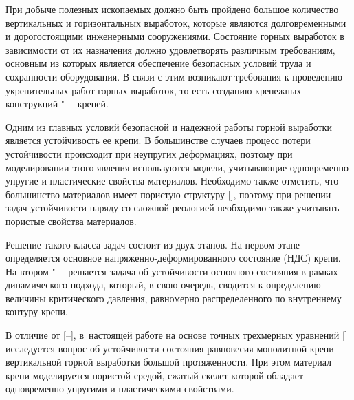 







\makerutitle




При добыче полезных ископаемых должно быть пройдено большое количество вертикальных и горизонтальных выработок, которые являются долговременными и дорогостоящими инженерными сооружениями. Состояние горных выработок в зависимости от их назначения должно удовлетворять различным требованиям, основным из которых является обеспечение безопасных условий труда и сохранности оборудования. В связи с этим возникают требования к проведению укрепительных работ горных выработок, то есть созданию крепежных конструкций "--- крепей. 



Одним из главных условий безопасной и надежной работы горной выработки является устойчивость ее крепи. В большинстве случаев процесс потери устойчивости происходит при неупругих деформациях, поэтому при моделировании этого явления используются модели, учитывающие одновременно упругие и пластические свойства материалов. Необходимо также отметить, что большинство материалов имеет пористую структуру [], поэтому при решении задач устойчивости наряду со сложной реологией необходимо также учитывать пористые свойства материалов. 



Решение такого класса задач состоит из двух этапов. На первом этапе определяется основное напряженно-деформированного состояние (НДС) крепи. На втором "--- решается задача об устойчивости основного состояния в рамках динамического подхода, который, в свою очередь, сводится к определению величины критического давления, равномерно распределенного по внутреннему контуру крепи.



В отличие от [--], в~настоящей работе на основе точных трехмерных уравнений [] исследуется вопрос об устойчивости состояния равновесия монолитной крепи вертикальной горной выработки большой протяженности. При этом материал крепи моделируется пористой средой, сжатый скелет которой обладает одновременно упругими и пластическими свойствами.




